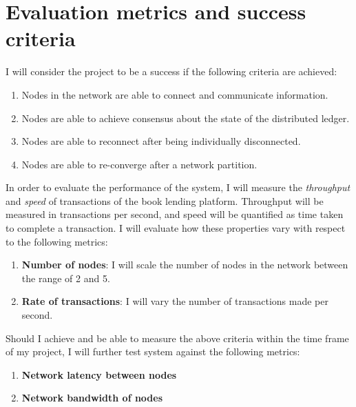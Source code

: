 \documentclass[12pt, letterpaper, twoside]{article}
\begin{document}
	\section*{Evaluation metrics and success criteria}
	I will consider the project to be a success if the following criteria are achieved:
	\begin{enumerate}
		\item Nodes in the network are able to connect and communicate information.
		\item Nodes are able to achieve consensus about the state of the distributed ledger.
		\item Nodes are able to reconnect after being individually disconnected.
		\item Nodes are able to re-converge after a network partition.
	\end{enumerate}
	In order to evaluate the performance of the system, I will measure the \textit{throughput} and \textit{speed} of transactions of the book lending platform. Throughput will be measured in transactions per second, and speed will be quantified as time taken to complete a transaction. I will evaluate how these properties vary with respect to the following metrics:
	\begin{enumerate}
		\item \textbf{Number of nodes}: I will scale the number of nodes in the network between the range of 2 and 5.
		\item \textbf{Rate of transactions}: I will vary the number of transactions made per second.
	\end{enumerate}
	Should I achieve and be able to measure the above criteria within the time frame of my project, I will further test system against the following metrics:
	\begin{enumerate}
		\item \textbf{Network latency between nodes}
		\item \textbf{Network bandwidth of nodes}
	\end{enumerate}
\end{document}
